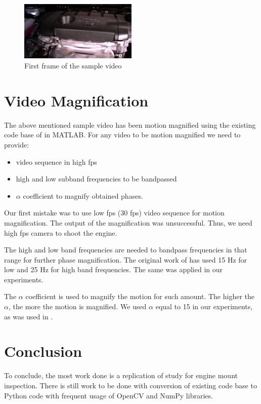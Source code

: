 \documentclass{IEEEtran}
\begin{document}
\begin{figure}[h]
	\centering
	\includegraphics[width=0.5\textwidth]{car_engine}
	\caption{First frame of the sample video}
	\label{fig:engine}
\end{figure}

\section{Video Magnification}

The above mentioned sample video has been motion magnified using the existing code base of \cite{Wadhwa:2013:PVM:2461912.2461966} in MATLAB. For any video to be motion magnified we need to provide:

\begin{itemize}
	\item{video sequence in high fps}
	\item{high and low subband frequencies to be bandpassed}
	\item{$\alpha$ coefficient to magnify obtained phases.}
\end{itemize}

Our first mistake was to use low fps (30 fps) video sequence for motion magnification. The output of the magnification was unsuccessful. Thus, we need high fps camera to shoot the engine.

The high and low band frequencies are needed to bandpass frequencies in that range for further phase magnification. The original work of \cite{Wadhwa:2013:PVM:2461912.2461966} has used 15 Hz for low and 25 Hz for high band frequencies. The same was applied in our experiments.

The $\alpha$ coefficient is used to magnify the motion for such amount. The higher the $\alpha$, the more the motion is magnified. We used $\alpha$ equal to 15 in our experiments, as was used in \cite{Wadhwa:2013:PVM:2461912.2461966}.

\section{Conclusion}

To conclude, the most work done is a replication of \cite{Wadhwa:2013:PVM:2461912.2461966} study for engine mount inspection. There is still work to be done with conversion of existing code base to Python code with frequent usage of OpenCV and NumPy libraries.



\printbibliography
\end{document}
